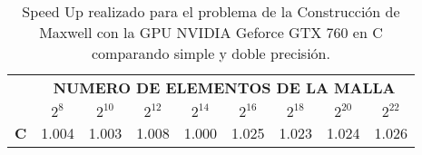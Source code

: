 \begin{table}[]
    \begin{tabular}{|c|c|c|c|c|c|c|c|c|}
    \hline
    \multirow{2}{*}{} & \multicolumn{8}{c|}{\textbf{NUMERO DE ELEMENTOS DE LA MALLA}} \\ \cline{2-9} 
                      & $2^8$ & $2^10$& $2^12$& $2^14$& $2^16$& $2^18$& $2^20$& $2^22$\\ \hline
    \textbf{C}        &1.004  &1.003  &1.008  &1.000  &1.025  &1.023  &1.024  &1.026  \\ \hline
    \end{tabular}
    \caption{Speed Up realizado para el problema de la Construcción de Maxwell con la GPU NVIDIA Geforce GTX 760 en C comparando simple y doble precisión.}
    \label{tab:c_760_MxC_c_10}
    \end{table}

    
